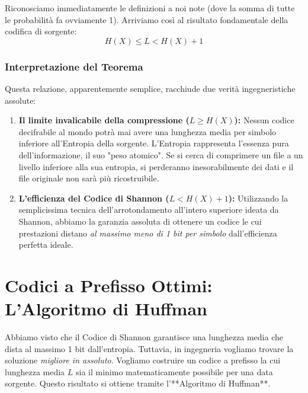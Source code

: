 Riconosciamo immediatamente le definizioni a noi note (dove la somma di tutte le probabilità fa ovviamente 1). Arriviamo così al risultato fondamentale della codifica di sorgente:
\begin{equation}
\boxed{ H(X) \le L < H(X) + 1 }
\end{equation}

\subsubsection{Interpretazione del Teorema}
Questa relazione, apparentemente semplice, racchiude due verità ingegneristiche assolute:
\begin{enumerate}
    \item \textbf{Il limite invalicabile della compressione ($L \ge H(X)$):} Nessun codice decifrabile al mondo potrà mai avere una lunghezza media per simbolo inferiore all'Entropia della sorgente. L'Entropia rappresenta l'essenza pura dell'informazione, il suo "peso atomico". Se si cerca di comprimere un file a un livello inferiore alla sua entropia, si perderanno inesorabilmente dei dati e il file originale non sarà più ricostruibile.
    \item \textbf{L'efficienza del Codice di Shannon ($L < H(X) + 1$):} Utilizzando la semplicissima tecnica dell'arrotondamento all'intero superiore ideata da Shannon, abbiamo la garanzia assoluta di ottenere un codice le cui prestazioni distano \textit{al massimo meno di 1 bit per simbolo} dall'efficienza perfetta ideale.
\end{enumerate}

\section{Codici a Prefisso Ottimi: L'Algoritmo di Huffman}

Abbiamo visto che il Codice di Shannon garantisce una lunghezza media che dista al massimo 1 bit dall'entropia. Tuttavia, in ingegneria vogliamo trovare la soluzione \textit{migliore in assoluto}. Vogliamo costruire un codice a prefisso la cui lunghezza media $L$ sia il minimo matematicamente possibile per una data sorgente. 
Questo risultato si ottiene tramite l'**Algoritmo di Huffman**.

